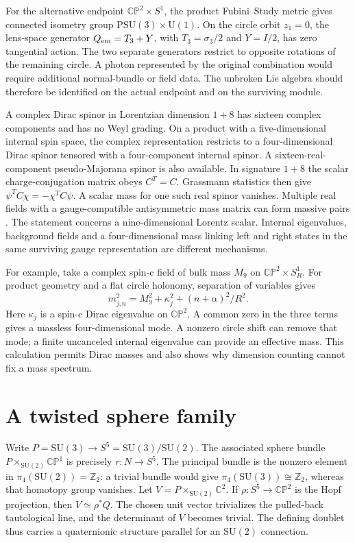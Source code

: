 \documentclass[11pt,oneside]{article}
\newcommand{\C}{\mathbb C}
\newcommand{\Z}{\mathbb Z}
\newcommand{\CP}{\mathbb{CP}}
\newcommand{\U}{\mathrm U}
\newcommand{\SU}{\mathrm{SU}}
\begin{document}
For the alternative endpoint \(\CP^2\times S^1\), the product Fubini--Study metric gives connected isometry group \(\mathrm{PSU}(3)\times\U(1)\). On the circle orbit \(z_1=0\), the lens-space generator \(Q_{\rm em}=T_3+Y\), with \(T_3=\sigma_3/2\) and \(Y=I/2\), has zero tangential action. The two separate generators restrict to opposite rotations of the remaining circle. A photon represented by the original combination would require additional normal-bundle or field data. The unbroken Lie algebra should therefore be identified on the actual endpoint and on the surviving module.

A complex Dirac spinor in Lorentzian dimension \(1+8\) has sixteen complex components and has no Weyl grading. On a product with a five-dimensional internal spin space, the complex representation restricts to a four-dimensional Dirac spinor tensored with a four-component internal spinor. A sixteen-real-component pseudo-Majorana spinor is also available. In signature \(1+8\) the scalar charge-conjugation matrix obeys \(C^T=C\). Grassmann statistics then give \(\psi^TC\chi=-\chi^TC\psi\). A scalar mass for one such real spinor vanishes. Multiple real fields with a gauge-compatible antisymmetric mass matrix can form massive pairs \cite{nishino}. The statement concerns a nine-dimensional Lorentz scalar. Internal eigenvalues, background fields and a four-dimensional mass linking left and right states in the same surviving gauge representation are different mechanisms.

For example, take a complex spin-c field of bulk mass \(M_9\) on \(\CP^2\times S^1_R\). For product geometry and a flat circle holonomy, separation of variables gives
\[
 m_{j,n}^2=M_9^2+\kappa_j^2+(n+\alpha)^2/R^2 .
\]
Here \(\kappa_j\) is a spin-c Dirac eigenvalue on \(\CP^2\). A common zero in the three terms gives a massless four-dimensional mode. A nonzero circle shift can remove that mode; a finite uncanceled internal eigenvalue can provide an effective mass. This calculation permits Dirac masses and also shows why dimension counting cannot fix a mass spectrum.

\section{A twisted sphere family}
Write \(P=\SU(3)\to S^5=\SU(3)/\SU(2)\). The associated sphere bundle \(P\times_{\SU(2)}\CP^1\) is precisely \(r:N\to S^5\). The principal bundle is the nonzero element in \(\pi_4(\SU(2))=\Z_2\): a trivial bundle would give \(\pi_4(\SU(3))\cong\Z_2\), whereas that homotopy group vanishes. Let \(V=P\times_{\SU(2)}\C^2\). If \(\rho:S^5\to\CP^2\) is the Hopf projection, then \(V\simeq\rho^*Q\). The chosen unit vector trivializes the pulled-back tautological line, and the determinant of \(V\) becomes trivial. The defining doublet thus carries a quaternionic structure parallel for an \(\SU(2)\) connection.
\end{document}
